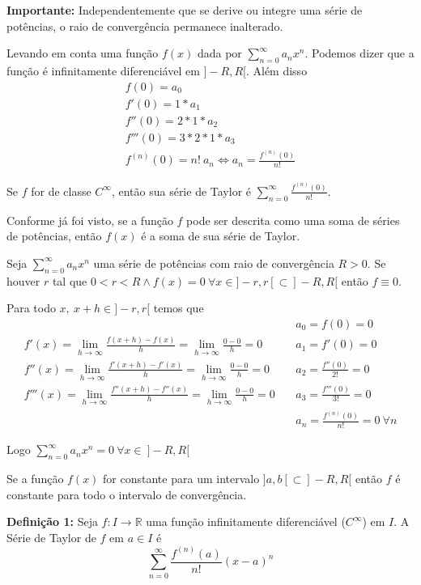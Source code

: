 \documentclass[12pt,openany, letterpaper]{book}
\newcommand{\LI}[1][n]{\lim_{{#1} \rightarrow \infty}}
\newcommand{\soma}[2][n]{\sum_{{#1} = #2}^\infty}
\begin{document}
{{\textbf{Importante:} Independentemente que se derive ou integre uma série de potências, o raio de convergência permanece inalterado.

Levando em conta uma função $f(x)$ dada por $\soma{0} a_n x^n$. Podemos dizer que a função é infinitamente diferenciável em $]-R,R[$. Além disso \begin{align*}
f(0) = a_0 \\
f'(0) = 1*a_1 \\
f''(0) = 2*1*a_2 \\
f'''(0) = 3*2*1*a_3 \\
f^{(n)}(0) = n!\ a_n \Longleftrightarrow a_n = \frac{f^{(n)}(0)}{n!}
\end{align*}

Se $f$ for de classe $C^\infty$, então sua série de Taylor é $\displaystyle{\soma{0} \frac{f^{(n)} (0)}{n!}}$.

Conforme já foi visto, se a função $f$ pode ser descrita como uma soma de séries de potências, então $f(x)$ é a soma de sua série de Taylor.

Seja $\displaystyle{\soma{0} a_n x^n}$ uma série de potências com raio de convergência $R > 0$. Se houver $r$ tal que $0 < r < R \land f(x) = 0 \ \forall x \in ]-r,r[ \subset ]-R,R[$ então $f \equiv 0$.

Para todo $x, \ x+h \in ]-r,r[$ temos que \begin{align}
        & \ & a_0 = f(0) = 0 \\
        f'(x) = \LI[h] \frac{f(x+h)-f(x)}{h} = \LI[h] \frac{0-0}{h} = 0 & \ & a_1 = f'(0) = 0 \\
        f''(x) = \LI[h] \frac{f'(x+h)-f'(x)}{h} = \LI[h] \frac{0-0}{h} = 0 & \ & a_2 = \frac{f''(0)}{2!} = 0 \\
        f'''(x) = \LI[h] \frac{f''(x+h)-f''(x)}{h} = \LI[h] \frac{0-0}{h} = 0 & \ & a_3 = \frac{f'''(0)}{3!} = 0\\
        & \ & a_n = \frac{f^{(n)}(0)}{n!} = 0 \ \forall n
    \end{align}

Logo $\displaystyle{\soma{0} a_n x^n = 0 \ \forall x \in \ ]-R,R[}$

Se a função $f(x)$ for constante para um intervalo $]a,b[ \subset ]-R,R[$ então $f$ é constante para todo o intervalo de convergência.
\vspace{5mm}

\textbf{Definição 1:} Seja $f: I \rightarrow \mathds{R}$ uma função infinitamente diferenciável ($C^\infty$) em $I$. A Série de Taylor de $f$ em $a \in I$ é $$\soma{0} \frac{f^{(n)}(a)}{n!} (x-a)^n$$ 

}}
\end{document}

